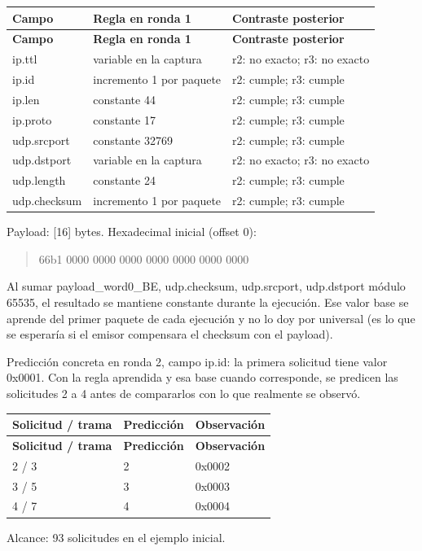\begingroup
\fontsize{9}{11}\selectfont
\addtocounter{table}{-1}
\begin{longtable}{p{3.1cm}p{5.8cm}p{5.1cm}}
\toprule
\textbf{Campo} & \textbf{Regla en ronda 1} & \textbf{Contraste posterior} \\ \midrule
\endfirsthead
\toprule
\textbf{Campo} & \textbf{Regla en ronda 1} & \textbf{Contraste posterior} \\ \midrule
\endhead
ip.ttl & variable en la captura & r2: no exacto; r3: no exacto \\
ip.id & incremento 1 por paquete & r2: cumple; r3: cumple \\
ip.len & constante 44 & r2: cumple; r3: cumple \\
ip.proto & constante 17 & r2: cumple; r3: cumple \\
udp.srcport & constante 32769 & r2: cumple; r3: cumple \\
udp.dstport & variable en la captura & r2: no exacto; r3: no exacto \\
udp.length & constante 24 & r2: cumple; r3: cumple \\
udp.checksum & incremento 1 por paquete & r2: cumple; r3: cumple \\
\bottomrule
\end{longtable}
\endgroup
Payload: [16] bytes. Hexadecimal inicial (offset 0):

\begin{quote}\ttfamily\footnotesize\raggedright 66b1 0000 0000 0000 0000 0000 0000 0000\end{quote}

Al sumar payload\_\allowbreak{}word0\_\allowbreak{}BE, udp.checksum, udp.srcport, udp.dstport módulo 65535, el resultado se mantiene constante durante la ejecución. Ese valor base se aprende del primer paquete de cada ejecución y no lo doy por universal (es lo que se esperaría si el emisor compensara el checksum con el payload).

Predicción concreta en ronda 2, campo ip.id: la primera solicitud tiene valor 0x0001. Con la regla aprendida y esa base cuando corresponde, se predicen las solicitudes 2 a 4 antes de compararlos con lo que realmente se observó.

\begingroup
\fontsize{9}{11}\selectfont
\addtocounter{table}{-1}
\begin{longtable}{p{3.2cm}p{5.1cm}p{5.1cm}}
\toprule
\textbf{Solicitud / trama} & \textbf{Predicción} & \textbf{Observación} \\ \midrule
\endfirsthead
\toprule
\textbf{Solicitud / trama} & \textbf{Predicción} & \textbf{Observación} \\ \midrule
\endhead
2 / 3 & 2 & 0x0002 \\
3 / 5 & 3 & 0x0003 \\
4 / 7 & 4 & 0x0004 \\
\bottomrule
\end{longtable}
\endgroup
Alcance: 93 solicitudes en el ejemplo inicial. 

